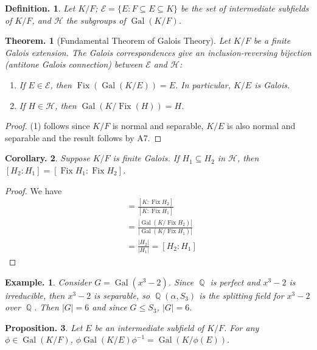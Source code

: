 \documentclass[11pt, a4paper]{memoir}
\DeclareMathOperator{\Q}{{\mathbb{Q}}}
\theoremstyle{change}
\newtheorem{theorem}{Theorem.}[section]
\newtheorem{corollary}[theorem]{Corollary.}
\newtheorem{proposition}[theorem]{Proposition.}
\theoremstyle{plain}
\theoremstyle{nonumberplain}
\newtheorem{definition}{Definition.}
\newtheorem{example}{Example.}
\newtheorem{proof}{Proof}
\DeclareMathOperator{\Fix}{Fix}
\DeclareMathOperator{\Gal}{Gal}
\numberwithin{equation}{section}
\begin{document}
\begin{definition}
    Let $K/F$; $\mathcal{E}=\{E:F\subseteq E\subseteq K\}$ be the set of intermediate subfields of $K/F$, and $\mathcal{H}$ the subgroups of $\Gal(K/F)$.
\end{definition}
\begin{theorem}[Fundamental Theorem of Galois Theory]
    Let $K/F$ be a finite Galois extension.
    The Galois correspondences give an inclusion-reversing bijection (antitone Galois connection) between $\mathcal{E}$ and $\mathcal{H}$:
    \begin{enumerate}[nolistsep]
        \item If $E\in\mathcal{E}$, then $\Fix(\Gal(K/E))=E$.
            In particular, $K/E$ is Galois.
        \item If $H\in\mathcal{H}$, then $\Gal(K/\Fix(H))=H$.
    \end{enumerate}
\end{theorem}
\begin{proof}
    (1) follows since $K/F$ is normal and separable, $K/E$ is also normal and separable and the result follows by A7.
\end{proof}
\begin{corollary}
    Suppose $K/F$ is finite Galois.
    If $H_1\subseteq H_2$ in $\mathcal{H}$, then $[H_2:H_1]=[\Fix H_1:\Fix H_2]$.
\end{corollary}
\begin{proof}
    We have
    \begin{align*}
        [\Fix H_1:\Fix H_2] &= \frac{[K:\Fix H_2]}{[K:\Fix H_1]}\\
                            &= \frac{|\Gal(K/\Fix H_2)|}{|\Gal(K/\Fix H_1)|}\\
                            &= \frac{|H_2|}{|H_1|}=[H_2:H_1]
    \end{align*}
\end{proof}
\begin{example}
    Consider $G=\Gal(x^3-2)$.
    Since $\Q$ is perfect and $x^3-2$ is irreducible, then $x^3-2$ is separable, so $\Q(\alpha,S_3)$ is the splitting field for $x^3-2$ over $\Q$.
    Then $|G|=6$ and since $G\leq S_3$, $|G|=6$.
\end{example}
\begin{proposition}
    Let $E$ be an intermediate subfield of $K/F$.
    For any $\phi\in\Gal(K/F)$, $\phi\Gal(K/E)\phi^{-1}=\Gal(K/\phi(E))$.
\end{proposition}
\end{document}
